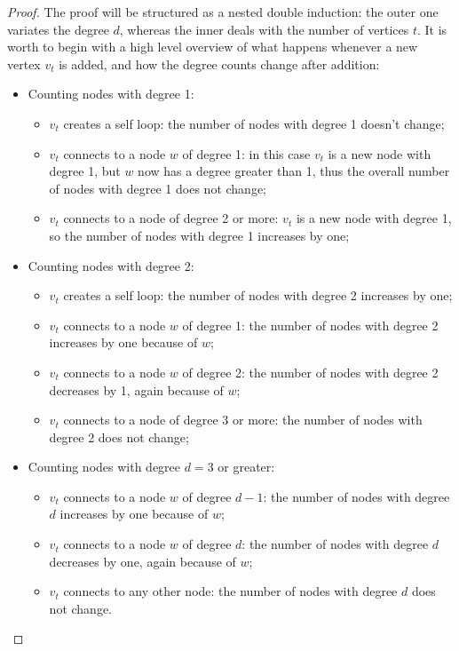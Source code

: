 \begin{proof}
    The proof will be structured as a nested double induction: the outer one variates the degree $d$, whereas the inner deals with the number of vertices $t$. It is worth to begin with a high level overview of what happens whenever a new vertex $v_t$ is added, and how the degree counts change after addition:

    \begin{itemize}
        \item Counting nodes with degree 1:
            \begin{itemize}
                \item $v_t$ creates a self loop: the number of nodes with degree 1 doesn't change;
                \item $v_t$ connects to a node $w$ of degree 1: in this case $v_t$ is a new node with degree 1, but $w$ now has a degree greater than 1, thus the overall number of nodes with degree 1 does not change;
                \item $v_t$ connects to a node of degree 2 or more: $v_t$ is a new node with degree 1, so the number of nodes with degree 1 increases by one;
            \end{itemize}
        \item Counting nodes with degree 2:
            \begin{itemize}
                \item $v_t$ creates a self loop: the number of nodes with degree 2 increases by one;
                \item $v_t$ connects to a node $w$ of degree 1: the number of nodes with degree 2 increases by one because of $w$;
                \item $v_t$ connects to a node $w$ of degree 2: the number of nodes with degree 2 decreases by 1, again because of $w$;
                \item $v_t$ connects to a node of degree 3 or more: the number of nodes with degree 2 does not change;
            \end{itemize}
        \item Counting nodes with degree $d = 3$ or greater:
            \begin{itemize}
                \item $v_t$ connects to a node $w$ of degree $d - 1$: the number of nodes with degree $d$ increases by one because of $w$;
                \item $v_t$ connects to a node $w$ of degree $d$: the number of nodes with degree $d$ decreases by one, again because of $w$;
                \item $v_t$ connects to any other node: the number of nodes with degree $d$ does not change.
            \end{itemize}
    \end{itemize}


\end{proof}
